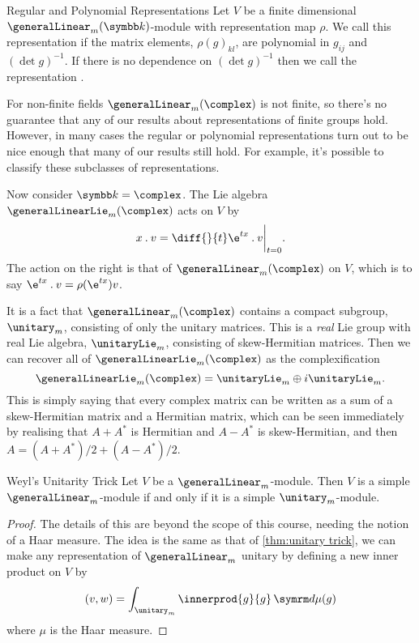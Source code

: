 \begin{dfn}{Regular and Polynomial Representations}{}
    Let \(V\) be a finite dimensional \(\generalLinear_m(\field)\)-module with representation map \(\rho\).
    We call this representation  if the matrix elements, \(\rho(g)_{kl}\), are polynomial in \(g_{ij}\) and \((\det g)^{-1}\).
    If there is no dependence on \((\det g)^{-1}\) then we call the representation .
\end{dfn}

For non-finite fields \(\generalLinear_m(\complex)\) is not finite, so there's no guarantee that any of our results about representations of finite groups hold.
However, in many cases the regular or polynomial representations turn out to be nice enough that many of our results still hold.
For example, it's possible to classify these subclasses of representations.

Now consider \(\field = \complex\).
The Lie algebra \(\generalLinearLie_m(\complex)\) acts on \(V\) by
\begin{equation}
    x \action v = \diff{}{t} \e^{tx} \action v \bigg|_{t = 0}.
\end{equation}
The action on the right is that of \(\generalLinear_m(\complex)\) on \(V\), which is to say \(\e^{tx} \action v = \rho(\e^{tx})v\).

It is a fact that \(\generalLinear_m(\complex)\) contains a compact subgroup, \(\unitary_m\), consisting of only the unitary matrices.
This is a \emph{real} Lie group with real Lie algebra, \(\unitaryLie_m\), consisting of skew-Hermitian matrices.
Then we can recover all of \(\generalLinearLie_m(\complex)\) as the complexification
\begin{equation}
    \generalLinearLie_m(\complex) = \unitaryLie_m \oplus i \unitaryLie_m.
\end{equation}
This is simply saying that every complex matrix can be written as a sum of a skew-Hermitian matrix and a Hermitian matrix, which can be seen immediately by realising that \(A + A^*\) is Hermitian and \(A - A^*\) is skew-Hermitian, and then \(A = (A + A^*)/2 + (A - A^*)/2\).

\begin{prp}{Weyl's Unitarity Trick}{}
    Let \(V\) be a \(\generalLinear_m\)-module.
    Then \(V\) is a simple \(\generalLinear_m\)-module if and only if it is a simple \(\unitary_m\)-module.
    \begin{proof}
        The details of this are beyond the scope of this course, needing the notion of a Haar measure.
        The idea is the same as that of \cref{thm:unitary trick}, we can make any representation of \(\generalLinear_m\) unitary by defining a new inner product on \(V\) by
        \begin{equation}
            (v, w) = \int_{\unitary_m} \innerprod{g}{g} \dd{\mu(g)}
        \end{equation}
        where \(\mu\) is the Haar measure.
    \end{proof}
\end{prp}

